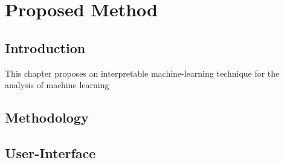 \chapter{Proposed Method}

\section{Introduction}
This chapter proposes an interpretable machine-learning technique for the analysis of machine learning

\section{Methodology}

\section{User-Interface}
